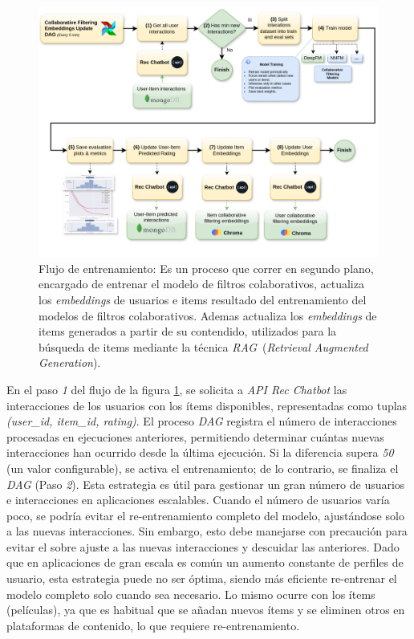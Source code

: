 \documentclass[11pt,a4paper,twoside]{thesis}
\begin{document}
\begin{figure}[H]
	\centering
	\label{fig:training-flow}
	\includegraphics[width=12cm]{./images/training.flow.png}
	\caption{Flujo de entrenamiento: Es un proceso que correr en segundo plano, encargado de entrenar el modelo de filtros colaborativos, actualiza los \textit{embeddings} de usuarios e items resultado del entrenamiento del modelos de filtros colaborativos. Ademas actualiza los \textit{embeddings} de items generados a partir de su contendido, utilizados para la búsqueda de items mediante la técnica \textit{RAG}~\cite{rag}(\textit{Retrieval Augmented Generation}).}
\end{figure}

En el paso \textit{1} del flujo de la figura \ref{fig:training-flow}, se solicita a \textit{API Rec Chatbot} las interacciones de los usuarios con los ítems disponibles, representadas como tuplas \textit{(user\_id, item\_id, rating)}. El proceso \textit{DAG} registra el número de interacciones procesadas en ejecuciones anteriores, permitiendo determinar cuántas nuevas interacciones han ocurrido desde la última ejecución. Si la diferencia supera \textit{50} (un valor configurable), se activa el entrenamiento; de lo contrario, se finaliza el \textit{DAG} (Paso \textit{2}). Esta estrategia es útil para gestionar un gran número de usuarios e interacciones en aplicaciones escalables. Cuando el número de usuarios varía poco, se podría evitar el re-entrenamiento completo del modelo, ajustándose solo a las nuevas interacciones. Sin embargo, esto debe manejarse con precaución para evitar el sobre ajuste a las nuevas interacciones y descuidar las anteriores. Dado que en aplicaciones de gran escala es común un aumento constante de perfiles de usuario, esta estrategia puede no ser óptima, siendo más eficiente re-entrenar el modelo completo solo cuando sea necesario. Lo mismo ocurre con los ítems (películas), ya que es habitual que se añadan nuevos ítems y se eliminen otros en plataformas de contenido, lo que requiere re-entrenamiento.
\end{document}

